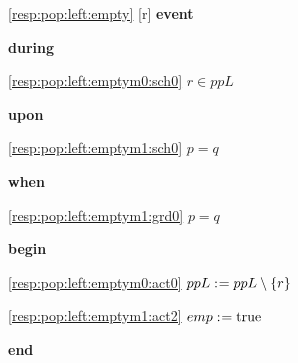 \noindent \ref{resp:pop:left:empty} [r] \textbf{event}
\begin{block}
  \item   \textbf{during}
  \begin{block}
  \item[ \eqref{resp:pop:left:emptym0:sch0} ]{$r \in ppL $} %
  \end{block}
  \item   \textbf{upon}
  \begin{block}
  \item[ \eqref{resp:pop:left:emptym1:sch0} ]{$p = q $} %
  \end{block}
  \item   \textbf{when}
  \begin{block}
  \item[ \eqref{resp:pop:left:emptym1:grd0} ]{$p = q $} %
  \end{block}
  \item   \textbf{begin}
  \begin{block}
  \item[ \eqref{resp:pop:left:emptym0:act0} ]{$ppL \mathrel{:\mkern1mu=} ppL \setminus \{ r \} $} %
  \item[ \eqref{resp:pop:left:emptym1:act2} ]{$emp \mathrel{:\mkern1mu=} \text{true} $} %
  \end{block}
  \item   \textbf{end} \\
\end{block}
